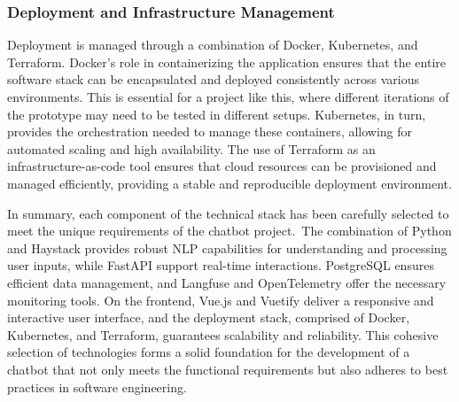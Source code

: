 \subsubsection{Deployment and Infrastructure Management}

Deployment is managed through a combination of Docker, Kubernetes, and Terraform.
Docker’s role in containerizing the
application ensures that the entire software stack can be encapsulated and deployed consistently across various
environments.
This is essential for a project like this, where different iterations of the prototype may need to be
tested in different setups.
Kubernetes, in turn, provides the orchestration needed to manage these containers, allowing
for automated scaling and high availability.
The use of Terraform as an infrastructure-as-code tool ensures that cloud
resources can be provisioned and managed efficiently, providing a stable and reproducible deployment environment.

\vspace{1cm}

In summary, each component of the technical stack has been carefully selected to meet the unique requirements of the
chatbot project.\ The combination of Python and Haystack provides robust NLP capabilities for understanding and
processing user inputs, while FastAPI support real-time interactions.
PostgreSQL ensures efficient data
management, and Langfuse and OpenTelemetry offer the necessary monitoring tools.
On the frontend, Vue.js and Vuetify deliver a responsive and interactive user interface, and the deployment stack,
comprised of Docker, Kubernetes, and
Terraform, guarantees scalability and reliability.
This cohesive selection of technologies forms a solid foundation for the development of a chatbot that not only meets
the functional requirements but also adheres to best practices in
software engineering.
